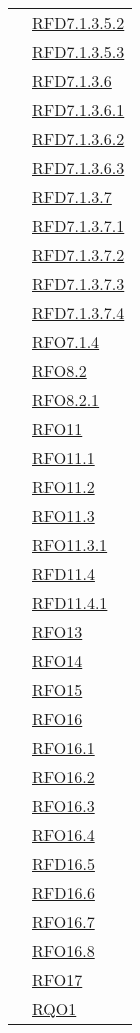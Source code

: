 \begin{longtable}{|>{\centering}m{5cm}|m{5cm}<{\centering}|}
& \hyperlink{RFD7.1.3.5.2}{RFD7.1.3.5.2}\\
& \hyperlink{RFD7.1.3.5.3}{RFD7.1.3.5.3}\\
& \hyperlink{RFD7.1.3.6}{RFD7.1.3.6}\\
& \hyperlink{RFD7.1.3.6.1}{RFD7.1.3.6.1}\\
& \hyperlink{RFD7.1.3.6.2}{RFD7.1.3.6.2}\\
& \hyperlink{RFD7.1.3.6.3}{RFD7.1.3.6.3}\\
& \hyperlink{RFD7.1.3.7}{RFD7.1.3.7}\\
& \hyperlink{RFD7.1.3.7.1}{RFD7.1.3.7.1}\\
& \hyperlink{RFD7.1.3.7.2}{RFD7.1.3.7.2}\\
& \hyperlink{RFD7.1.3.7.3}{RFD7.1.3.7.3}\\
& \hyperlink{RFD7.1.3.7.4}{RFD7.1.3.7.4}\\
& \hyperlink{RFO7.1.4}{RFO7.1.4}\\
& \hyperlink{RFO8.2}{RFO8.2}\\
& \hyperlink{RFO8.2.1}{RFO8.2.1}\\
& \hyperlink{RFO11}{RFO11}\\
& \hyperlink{RFO11.1}{RFO11.1}\\
& \hyperlink{RFO11.2}{RFO11.2}\\
& \hyperlink{RFO11.3}{RFO11.3}\\
& \hyperlink{RFO11.3.1}{RFO11.3.1}\\
& \hyperlink{RFD11.4}{RFD11.4}\\
& \hyperlink{RFD11.4.1}{RFD11.4.1}\\
& \hyperlink{RFO13}{RFO13}\\
& \hyperlink{RFO14}{RFO14}\\
& \hyperlink{RFO15}{RFO15}\\
& \hyperlink{RFO16}{RFO16}\\
& \hyperlink{RFO16.1}{RFO16.1}\\
& \hyperlink{RFO16.2}{RFO16.2}\\
& \hyperlink{RFO16.3}{RFO16.3}\\
& \hyperlink{RFO16.4}{RFO16.4}\\
& \hyperlink{RFD16.5}{RFD16.5}\\
& \hyperlink{RFD16.6}{RFD16.6}\\
& \hyperlink{RFO16.7}{RFO16.7}\\
& \hyperlink{RFO16.8}{RFO16.8}\\
& \hyperlink{RFO17}{RFO17}\\
& \hyperlink{RQO1}{RQO1}\\

\end{longtable}
